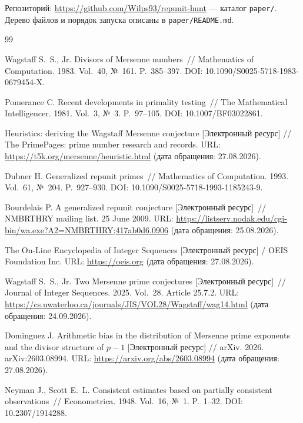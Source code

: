 \documentclass[11pt,a4paper]{article}
\theoremstyle{plain}
\theoremstyle{remark}
\begin{document}
Репозиторий: \url{https://github.com/Wilps93/repunit-hunt} --- каталог
\texttt{paper/}. Дерево файлов и порядок запуска описаны в \texttt{paper/README.md}.

\renewcommand{\refname}{Список источников}
\begin{thebibliography}{99}

 Wagstaff S.~S., Jr. Divisors of Mersenne numbers~//
Mathematics of Computation. 1983. Vol.~40, №~161. P.~385--397.
DOI: 10.1090/S0025-5718-1983-0679454-X.

 Pomerance C. Recent developments in primality testing~//
The Mathematical Intelligencer. 1981. Vol.~3, №~3. P.~97--105.
DOI: 10.1007/BF03022861.

 Heuristics: deriving the Wagstaff Mersenne conjecture
[Электронный ресурс] // The PrimePages: prime number research and records.
URL: \url{https://t5k.org/mersenne/heuristic.html} (дата обращения: 27.08.2026).

 Dubner H. Generalized repunit primes~//
Mathematics of Computation. 1993. Vol.~61, №~204. P.~927--930.
DOI: 10.1090/S0025-5718-1993-1185243-9.

 Bourdelais P. A generalized repunit conjecture
[Электронный ресурс]~// NMBRTHRY mailing list. 25 June 2009.
URL: \url{https://listserv.nodak.edu/cgi-bin/wa.exe?A2=NMBRTHRY;417ab0d6.0906}
(дата обращения: 25.08.2026).

 The On-Line Encyclopedia of Integer Sequences
[Электронный ресурс] / OEIS Foundation Inc.
URL: \url{https://oeis.org} (дата обращения: 27.08.2026).

 Wagstaff S.~S., Jr. Two Mersenne prime conjectures
[Электронный ресурс]~// Journal of Integer Sequences. 2025. Vol.~28.
Article 25.7.2.
URL: \url{https://cs.uwaterloo.ca/journals/JIS/VOL28/Wagstaff/wag14.html}
(дата обращения: 24.09.2026).

 Dominguez J. Arithmetic bias in the distribution of Mersenne
prime exponents and the divisor structure of $p-1$ [Электронный ресурс] // arXiv.
2026. arXiv:2603.08994. URL: \url{https://arxiv.org/abs/2603.08994}
(дата обращения: 27.08.2026).

 Neyman J., Scott E.~L. Consistent estimates based on
partially consistent observations~// Econometrica. 1948. Vol.~16, №~1. P.~1--32.
DOI: 10.2307/1914288.


\end{thebibliography}
\end{document}

